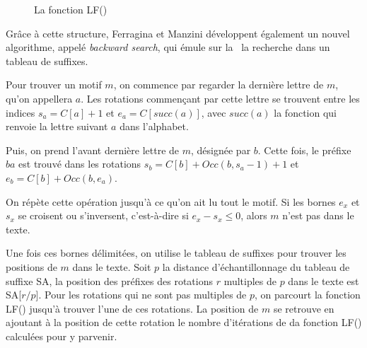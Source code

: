 \begin{figure}[h!]
\caption{La fonction LF()}
\label{lf} 
\end{figure}

Grâce à cette structure, Ferragina et Manzini développent également un nouvel algorithme, appelé \textit{backward search}, qui émule sur la \bwt\ la recherche dans un tableau de suffixes.

Pour trouver un motif $m$, on commence par regarder la dernière lettre de $m$, qu'on appellera $a$. Les rotations commençant par cette lettre se trouvent entre les indices $s_a = C[a] + 1$ et $e_a = C[succ(a)]$, avec $succ(a)$ la fonction qui renvoie la lettre suivant $a$ dans l'alphabet. 

Puis, on prend l'avant dernière lettre de $m$, désignée par $b$. Cette fois, le préfixe $ba$ est trouvé dans les rotations $s_b = C[b] + Occ(b, s_a-1) + 1$ et $e_b = C[b] + Occ(b, e_a)$.

On répète cette opération jusqu'à ce qu'on ait lu tout le motif. Si les bornes $e_x$ et $s_x$ se croisent ou s'inversent, c'est-à-dire si $e_x - s_x \le 0$, alors $m$ n'est pas dans le texte.

Une fois ces bornes délimitées, on utilise le tableau de suffixes pour trouver les positions de $m$ dans le texte. Soit $p$ la distance d'échantillonnage du tableau de suffixe SA, la position des préfixes des rotations $r$ multiples de $p$ dans le texte est SA[$r/p$]. Pour les rotations qui ne sont pas multiples de $p$, on parcourt la fonction LF() jusqu'à trouver l'une de ces rotations. La position de $m$ se retrouve en ajoutant à la position de cette rotation le nombre d'itérations de da fonction LF() calculées pour y parvenir.

